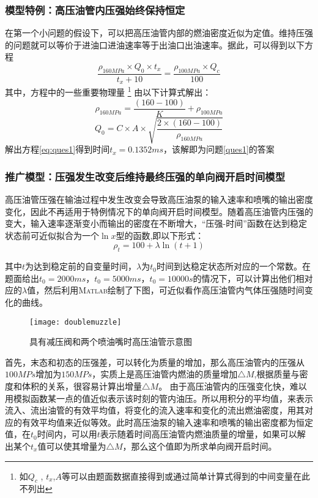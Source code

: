 \documentclass{cumcmthesis}
\begin{document}
\subsubsection{模型特例：高压油管内压强始终保持恒定}\label{case0}
在第一个小问题的假设下，可以把高压油管内部的燃油密度近似为定值。维持压强的问题就可以等价于进油口进油速率等于出油口出油速率。据此，可以得到以下方程
\begin{equation}
	\frac{ \rho_{160MPa}\times Q_{0}\times t_{x}}{t_{x}+10}=\frac{ \rho_{100MPa}\times Q_{c}}{100}\label{eq:ques1}
\end{equation}
其中，方程中的一些重要物理量 \footnote{如$Q_{c}$ , $t_{x}$,$A$等可以由题面数据直接得到或通过简单计算式得到的中间变量在此不列出} 由以下计算式解出：
\begin{equation}
	\rho_{160MPa} = \frac{(160-100)}K+\rho_{100MPa}
\end{equation}
\begin{equation}
	Q_{0} = C\times A\times \sqrt{\frac{2\times (160-100)}{\rho_{160MPa}}}
\end{equation}
解出方程\cref{eq:ques1}得到时间$t_{x} = 0.1352ms$，该解即为问题\ref{ques1}的答案

\subsubsection{推广模型：压强发生改变后维持最终压强的单向阀开启时间模型}
高压油管压强在输油过程中发生改变会导致高压油泵的输入速率和喷嘴的输出密度变化，因此不再适用于特例情况下的单向阀开启时间模型。随着高压油管内压强的变大，输入速率逐渐变小而输出的密度在不断增大，``压强-时间''函数在达到稳定状态前可近似拟合为一个$\ln x$型的函数,即以下形式：
\begin{equation}
	\rho_{t} = 100+\lambda\ln (t+1)\label{eq:ques2}	
\end{equation}

其中$t$为达到稳定前的自变量时间，$\lambda$为$t_{0}$时间到达稳定状态所对应的一个常数。在题面给出$t_{0}=2000ms$，$t_{0}=5000ms$，$t_{0}=10000s$的情况下，可以计算出他们相对应的$\lambda$值，然后利用\textsc{Matlab}绘制了下图，可近似看作高压油管内气体压强随时间变化的曲线。

\begin{figure}[!h]
	\centering 
	\texttt{[image: doublemuzzle]}
	\caption{具有减压阀和两个喷油嘴时高压油管示意图 }
	\label{fig:f(t)-picture}
\end{figure}
\newpage
首先，末态和初态的压强差，可以转化为质量的增加，那么高压油管内的压强从${100MPs}$增加为${150MPs}$，实质上是高压油管内燃油的质量增加${\triangle M}$,根据质量与密度和体积的关系，很容易计算出增量${\triangle M}$。
由于高压油管内的压强变化快，难以用模拟函数某一点的值近似表示该时刻的管内油压。所以用积分的平均值，来表示流入、流出油管的有效平均值，将变化的流入速率和变化的流出燃油密度，用其对应的有效平均值来近似等效。此时高压油泵的输入速率和喷嘴的输出密度都为恒定值，在$t_{0}$时间内，可以用$t$表示随着时间高压油管内燃油质量的增量，如果可以解出某个$t_{x}$值可以使其增量为${\triangle M}$，那么这个值即为所求单向阀开启时间。
\end{document}
